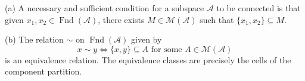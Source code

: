 (a) A necessary and sufficient condition for a subspace $\mathcal{A}$ to be connected is that given $x_1, x_2 \in \operatorname{Fnd}(\mathcal{A})$, there exists $M \in \mathcal{M}(\mathcal{A})$ such that $\{x_1, x_2\} \subseteq M$.

(b) The relation $\sim$ on $\operatorname{Fnd}(\mathcal{A})$ given by
$$x \sim y \Leftrightarrow \{x, y\} \subseteq A \text{ for some } A \in \mathcal{M}(\mathcal{A})$$
is an equivalence relation. The equivalence classes are precisely the cells of the component partition.
